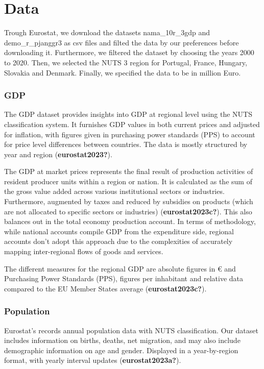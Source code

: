 \documentclass[
  a4paper,
  DIV=11,
  numbers=noendperiod]{scrartcl}
\begin{document}
\hypertarget{data}{%
\section{Data}\label{data}}

Trough Eurostat, we download the datasets nama\_10r\_3gdp and
demo\_r\_pjanggr3 as csv files and filted the data by our preferences
before downloading it. Furthermore, we filtered the dataset by choosing
the years 2000 to 2020. Then, we selected the NUTS 3 region for
Portugal, France, Hungary, Slovakia and Denmark. Finally, we specified
the data to be in million Euro.

\hypertarget{gdp}{%
\subsubsection{GDP}\label{gdp}}

The GDP dataset provides insights into GDP at regional level using the
NUTS classification system. It furnishes GDP values in both current
prices and adjusted for inflation, with figures given in purchasing
power standards (PPS) to account for price level differences between
countries. The data is mostly structured by year and region
(\textbf{eurostat2023?}).

The GDP at market prices represents the final result of production
activities of resident producer units within a region or nation. It is
calculated as the sum of the gross value added across various
institutional sectors or industries. Furthermore, augmented by taxes and
reduced by subsidies on products (which are not allocated to specific
sectors or industries) (\textbf{eurostat2023c?}). This also balances out
in the total economy production account. In terms of methodology, while
national accounts compile GDP from the expenditure side, regional
accounts don't adopt this approach due to the complexities of accurately
mapping inter-regional flows of goods and services.

The different measures for the regional GDP are absolute figures in €
and Purchasing Power Standards (PPS), figures per inhabitant and
relative data compared to the EU Member States average
(\textbf{eurostat2023c?}).

\hypertarget{population}{%
\subsubsection{Population}\label{population}}

Eurostat's records annual population data with NUTS classification. Our
dataset includes information on births, deaths, net migration, and may
also include demographic information on age and gender. Displayed in a
year-by-region format, with yearly interval updates
(\textbf{eurostat2023a?}).
\end{document}

